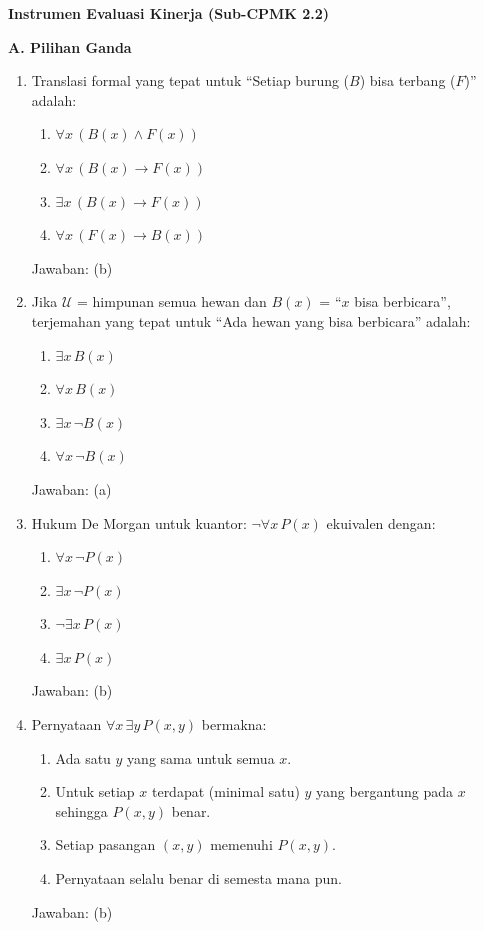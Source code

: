 \documentclass[../main]{subfiles}
\begin{document}
\begin{asesmen}
\textbf{Instrumen Evaluasi Kinerja (Sub-CPMK 2.2)}

\textbf{A. Pilihan Ganda}
\begin{enumerate}
  \item Translasi formal yang tepat untuk ``Setiap burung ($B$) bisa terbang ($F$)'' adalah:
  \begin{enumerate}
    \item $\forall x \, (B(x) \land F(x))$
    \item $\forall x \, (B(x) \rightarrow F(x))$
    \item $\exists x \, (B(x) \rightarrow F(x))$
    \item $\forall x \, (F(x) \rightarrow B(x))$
  \end{enumerate}
  Jawaban: (b)

  \item Jika $\mathcal{U}$ = himpunan semua hewan dan $B(x)$ = ``$x$ bisa berbicara'', terjemahan yang tepat untuk ``Ada hewan yang bisa berbicara'' adalah:
  \begin{enumerate}
    \item $\exists x \, B(x)$
    \item $\forall x \, B(x)$
    \item $\exists x \, \neg B(x)$
    \item $\forall x \, \neg B(x)$
  \end{enumerate}
  Jawaban: (a)

  \item Hukum De Morgan untuk kuantor: $\neg \forall x \, P(x)$ ekuivalen dengan:
  \begin{enumerate}
    \item $\forall x \, \neg P(x)$
    \item $\exists x \, \neg P(x)$
    \item $\neg \exists x \, P(x)$
    \item $\exists x \, P(x)$
  \end{enumerate}
  Jawaban: (b)

  \item Pernyataan $\forall x \, \exists y \, P(x,y)$ bermakna:
  \begin{enumerate}
    \item Ada satu $y$ yang sama untuk semua $x$.
    \item Untuk setiap $x$ terdapat (minimal satu) $y$ yang bergantung pada $x$ sehingga $P(x,y)$ benar.
    \item Setiap pasangan $(x,y)$ memenuhi $P(x,y)$.
    \item Pernyataan selalu benar di semesta mana pun.
  \end{enumerate}
  Jawaban: (b)
\end{enumerate}


\end{asesmen}
\end{document}
